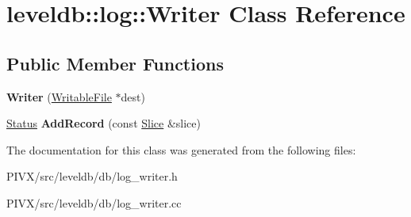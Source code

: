\hypertarget{classleveldb_1_1log_1_1_writer}{}\section{leveldb\+:\+:log\+:\+:Writer Class Reference}
\label{classleveldb_1_1log_1_1_writer}
\subsection*{Public Member Functions}
\begin{DoxyCompactItemize}
\item 
\mbox{\label{classleveldb_1_1log_1_1_writer_a424f67be4485fdf3ef8ba55c9c559c90}} 
{\bfseries Writer} (\mbox{\hyperlink{classleveldb_1_1_writable_file}{Writable\+File}} $\ast$dest)
\item 
\mbox{\label{classleveldb_1_1log_1_1_writer_acb4abda5a5348ac1771657ff01bf2fad}} 
\mbox{\hyperlink{classleveldb_1_1_status}{Status}} {\bfseries Add\+Record} (const \mbox{\hyperlink{classleveldb_1_1_slice}{Slice}} \&slice)
\end{DoxyCompactItemize}


The documentation for this class was generated from the following files\+:\begin{DoxyCompactItemize}
\item 
P\+I\+V\+X/src/leveldb/db/log\+\_\+writer.\+h\item 
P\+I\+V\+X/src/leveldb/db/log\+\_\+writer.\+cc\end{DoxyCompactItemize}
